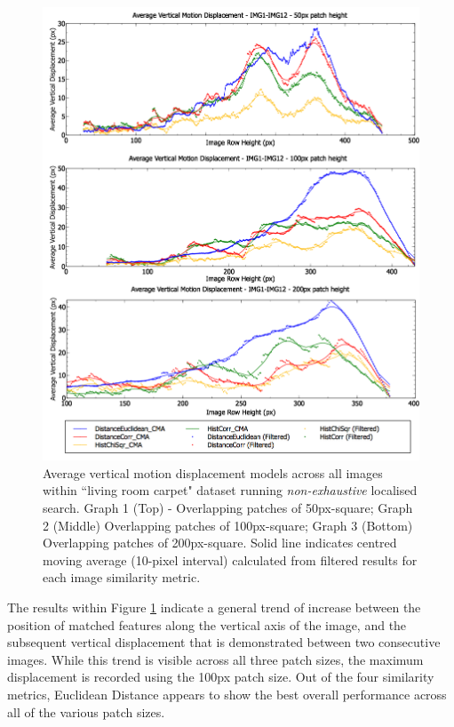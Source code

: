 \begin{figure}[ht!]
\centering
\includegraphics[scale=0.4]{images/results/ex1_results_flat_10cm}
\caption{Average vertical motion displacement models across all images within ``living room carpet" dataset running \textit{non-exhaustive} localised search. Graph 1 (Top) - Overlapping patches of 50px-square; Graph 2 (Middle) Overlapping patches of 100px-square; Graph 3 (Bottom) Overlapping patches of 200px-square. Solid line indicates centred moving average (10-pixel interval) calculated from filtered results for each image similarity metric.}
\label{fig:ex1_1_1}
\end{figure}

The results within Figure \ref{fig:ex1_1_1} indicate a general trend of increase between the position of matched features along the vertical axis of the image, and the subsequent vertical displacement that is demonstrated between two consecutive images. While this trend is visible across all three patch sizes, the maximum displacement is recorded using the 100px patch size. Out of the four similarity metrics, Euclidean Distance appears to show the best overall performance across all of the various patch sizes.

